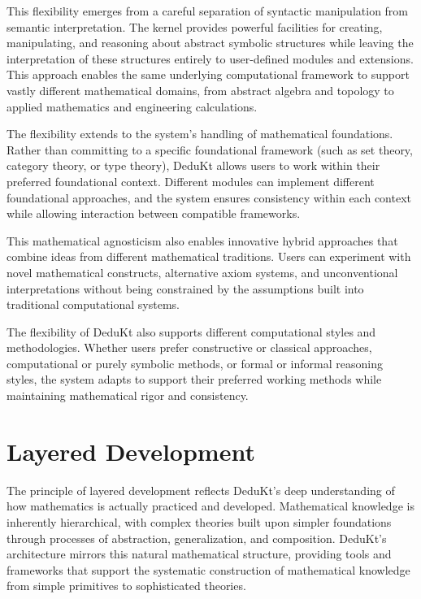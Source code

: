 This flexibility emerges from a careful separation of syntactic manipulation from semantic interpretation.
The kernel provides powerful facilities for creating, manipulating, and reasoning about abstract symbolic structures while leaving the interpretation of these structures entirely to user-defined modules and extensions.
This approach enables the same underlying computational framework to support vastly different mathematical domains, from abstract algebra and topology to applied mathematics and engineering calculations.

The flexibility extends to the system's handling of mathematical foundations.
Rather than committing to a specific foundational framework (such as set theory, category theory, or type theory), DeduKt allows users to work within their preferred foundational context.
Different modules can implement different foundational approaches, and the system ensures consistency within each context while allowing interaction between compatible frameworks.

This mathematical agnosticism also enables innovative hybrid approaches that combine ideas from different mathematical traditions.
Users can experiment with novel mathematical constructs, alternative axiom systems, and unconventional interpretations without being constrained by the assumptions built into traditional computational systems.

The flexibility of DeduKt also supports different computational styles and methodologies.
Whether users prefer constructive or classical approaches, computational or purely symbolic methods, or formal or informal reasoning styles, the system adapts to support their preferred working methods while maintaining mathematical rigor and consistency.

\section{Layered Development}\label{sec:layered-development}

The principle of layered development reflects DeduKt's deep understanding of how mathematics is actually practiced and developed.
Mathematical knowledge is inherently hierarchical, with complex theories built upon simpler foundations through processes of abstraction, generalization, and composition.
DeduKt's architecture mirrors this natural mathematical structure, providing tools and frameworks that support the systematic construction of mathematical knowledge from simple primitives to sophisticated theories.

